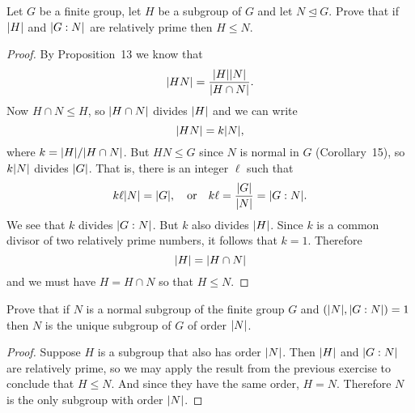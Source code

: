  Let $G$ be a finite group, let $H$ be a subgroup of $G$
and let $N\trianglelefteq G$. Prove that if $\lvert{H}\rvert$ and $\lvert{G:N}\rvert$
are relatively prime then $H\leq N$.
\begin{proof}
  By Proposition~13 we know that
  \begin{equation*}
    \lvert{HN}\rvert = \frac{\lvert{H}\rvert\lvert{N}\rvert}{\lvert{H\cap N}\rvert}.
  \end{equation*}
  Now $H\cap N\leq H$, so $\lvert{H\cap N}\rvert$ divides $\lvert{H}\rvert$ and we can
  write
  \begin{equation*}
    \lvert{HN}\rvert = k\lvert{N}\rvert,
  \end{equation*}
  where $k = \lvert{H}\rvert/\lvert{H\cap N}\rvert$. But $HN\leq G$ since $N$ is
  normal in $G$ (Corollary~15), so $k\lvert{N}\rvert$ divides $\lvert{G}\rvert$. That
  is, there is an integer $\ell$ such that
  \begin{equation*}
    k\ell\lvert{N}\rvert = \lvert{G}\rvert,
    \quad\text{or}\quad
    k\ell = \frac{\lvert{G}\rvert}{\lvert{N}\rvert} = \lvert{G:N}\rvert.
  \end{equation*}
  We see that $k$ divides $\lvert{G:N}\rvert$. But $k$ also divides
  $\lvert{H}\rvert$. Since $k$ is a common divisor of two relatively prime
  numbers, it follows that $k = 1$. Therefore
  \begin{equation*}
    \lvert{H}\rvert = \lvert{H\cap N}\rvert
  \end{equation*}
  and we must have $H = H\cap N$ so that $H\leq N$.
\end{proof}

 Prove that if $N$ is a normal subgroup of the finite
group $G$ and $(\lvert{N}\rvert,\lvert{G:N}\rvert) = 1$ then $N$ is the unique
subgroup of $G$ of order $\lvert{N}\rvert$.
\begin{proof}
  Suppose $H$ is a subgroup that also has order $\lvert{N}\rvert$. Then
  $\lvert{H}\rvert$ and $\lvert{G:N}\rvert$ are relatively prime, so we may apply the
  result from the previous exercise to conclude that $H\leq N$. And
  since they have the same order, $H = N$. Therefore $N$ is the only
  subgroup with order $\lvert{N}\rvert$.
\end{proof}

